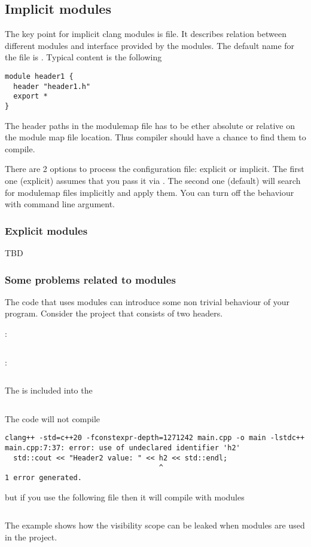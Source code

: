 \subsection{Implicit modules}
The key point for implicit clang modules is 
file. It describes relation between different modules and interface
provided by the modules. The default name for the file is
. Typical content is the following
\begin{verbatim}
module header1 {
  header "header1.h"
  export *
}
\end{verbatim}
The header paths in the modulemap file has to be ether absolute or
relative on the module map file location. Thus compiler should have a
chance to find them to compile.

There are 2 options to process the configuration file: explicit or
implicit. The first one (explicit) assumes that you pass it via
. The
second one (default) will search for modulemap files implicitly and
apply them. You can turn off the behaviour with
 command line argument.


\subsubsection{Explicit modules}
TBD

\subsubsection{Some problems related to modules}
The code that uses modules can introduce some non trivial behaviour of
your program. Consider the project that consists of two headers.

:
\inputminted{c++}{./src/pcm/nontrivial/header1.h}

:
\inputminted{c++}{./src/pcm/nontrivial/header2.h}

The  is included into the
\inputminted{c++}{./src/pcm/nontrivial/main.cpp}

The code will not compile

\begin{verbatim}
clang++ -std=c++20 -fconstexpr-depth=1271242 main.cpp -o main -lstdc++
main.cpp:7:37: error: use of undeclared identifier 'h2'
  std::cout << "Header2 value: " << h2 << std::endl;
                                    ^
1 error generated.
\end{verbatim}
but if you use the following  file
then it will compile with modules
\inputminted{text}{./src/pcm/nontrivial/module.modulemap}
The example shows how the visibility scope can be leaked when
modules are used in the project. 


